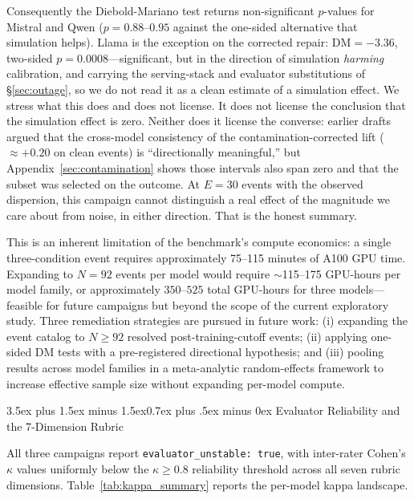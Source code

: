 \documentclass[11pt,journal,onecolumn]{IEEEtran}
\makeatletter
\renewcommand\subsection{\@startsection{subsection}{2}{\z@}%
  {3.5ex plus 1.5ex minus 1.5ex}{0.7ex plus .5ex minus 0ex}%
  {\normalfont\normalsize\bfseries}}
\makeatother
\begin{document}
Consequently the Diebold-Mariano test returns non-significant $p$-values for Mistral and Qwen ($p = 0.88$--$0.95$ against the one-sided alternative that simulation helps). Llama is the exception on the corrected repair: $\text{DM} = -3.36$, two-sided $p = 0.0008$---significant, but in the direction of simulation \emph{harming} calibration, and carrying the serving-stack and evaluator substitutions of \S\ref{sec:outage}, so we do not read it as a clean estimate of a simulation effect. We stress what this does and does not license. It does not license the conclusion that the simulation effect is zero. Neither does it license the converse: earlier drafts argued that the cross-model consistency of the contamination-corrected lift ($\approx +0.20$ on clean events) is ``directionally meaningful,'' but Appendix~\ref{sec:contamination} shows those intervals also span zero and that the subset was selected on the outcome. At $E=30$ events with the observed dispersion, this campaign cannot distinguish a real effect of the magnitude we care about from noise, in either direction. That is the honest summary.

This is an inherent limitation of the benchmark's compute economics: a single three-condition event requires approximately 75--115 minutes of A100 GPU time. Expanding to $N=92$ events per model would require $\sim$115--175 GPU-hours per model family, or approximately $350$--$525$ total GPU-hours for three models---feasible for future campaigns but beyond the scope of the current exploratory study. Three remediation strategies are pursued in future work: (i) expanding the event catalog to $N \geq 92$ resolved post-training-cutoff events; (ii) applying one-sided DM tests with a pre-registered directional hypothesis; and (iii) pooling results across model families in a meta-analytic random-effects framework to increase effective sample size without expanding per-model compute.

\subsection{Evaluator Reliability and the 7-Dimension Rubric}
\label{sec:evaluator_reliability}

All three campaigns report \texttt{evaluator\_unstable: true}, with inter-rater Cohen's $\kappa$ values uniformly below the $\kappa \geq 0.8$ reliability threshold across all seven rubric dimensions. Table~\ref{tab:kappa_summary} reports the per-model kappa landscape.
\end{document}
